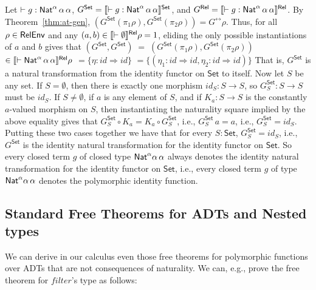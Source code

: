 \documentclass{lmcs}
\theoremstyle{plain}\newtheorem{satz}[thm]{Satz}
\newcommand{\set}{\mathsf{Set}}
\renewcommand{\id}{\mathit{id}}
\begin{document}
Let $ \vdash g : \mathsf{Nat}^\alpha \,\alpha\,\alpha$, \/$G^\set =
\setsem{\vdash g : \Nat^\alpha \,\alpha\,\alpha}$, and $G^{\mathsf{Rel}} =
\llbracket{\vdash g : \mathsf{Nat}^\alpha \,\alpha\,\alpha}\rrbracket^{\mathsf{Rel}}$.  By
Theorem~\ref{thm:at-gen}, $(G^\set(\pi_1\rho),G^\set(\pi_2\rho)) =
G^\rel\rho$. Thus, for all $\rho \in \mathsf{RelEnv}$ and any $(a, b) \in
\llbracket{\vdash \emptyset}\rrbracket^{\mathsf{Rel}}\rho = 1$, eliding the only possible
instantiations of $a$ and $b$ gives that $(G^\set, G^\set) \; = \;
(G^\set(\pi_1 \rho), G^\set (\pi_2 \rho))$ $ \in \llbracket{\vdash
  \mathsf{Nat}^\alpha \,\alpha\,\alpha}\rrbracket^{\mathsf{Rel}}\rho$ $ = \{\eta : \id \Rightarrow
\id\}$ $ = \{(\eta_1 : \id \Rightarrow \id, \eta_2 : \id \Rightarrow
\id)\}$ That is, $G^\set$ is a natural transformation from the
identity functor on $\set$ to itself. Now let $S$ be any set.  If $S =
\emptyset$, then there is exactly one morphism $\id_S: S \to S$, so
$G^\set_S : S \to S$ must be $\id_S$. If $S \not = \emptyset$, if $a$
is any element of $S$, and if $K_a :S \to S$ is the constantly
$a$-valued morphism on $S$, then instantiating the naturality square
implied by the above equality gives that $G^\set_S \circ K_a = K_a
\circ G^\set_S$, i.e., $G^\set_S \, a = a$, i.e., $G^\set_S = \id_S$.
Putting these two cases together we have that for every $S : \set$,
$G^\set_S = \id_S$, i.e., $G^\set$ is the identity natural
transformation for the identity functor on $\set$. So every closed
term $g$ of closed type $\mathsf{Nat}^\alpha\alpha\,\alpha$ always denotes the
identity natural transformation for the identity functor on $\set$,
i.e., every closed term $g$ of type $\mathsf{Nat}^\alpha\alpha\,\alpha$
denotes the polymorphic identity function.

\subsection{Standard Free Theorems for ADTs and Nested
  types}\label{sec:ft-adt} 

We can derive in our calculus even those free theorems for polymorphic
functions over ADTs that are not consequences of naturality.  We can,
e.g., prove the free theorem for $\mathit{filter}$'s type as follows:
\end{document}
